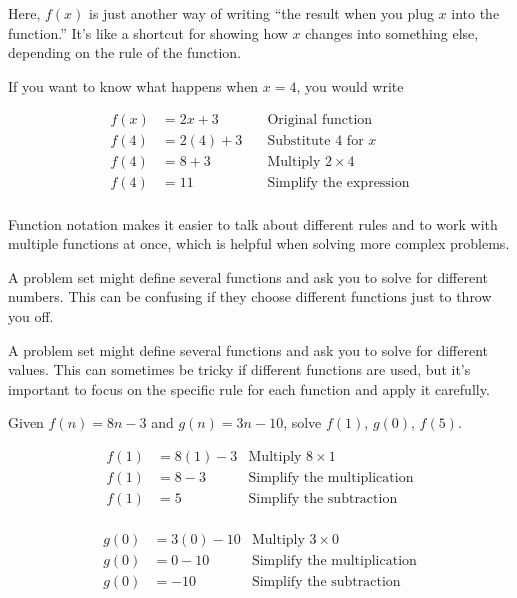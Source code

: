 \documentclass[12pt]{article}
\begin{document}
Here, $f(x)$ is just another way of writing ``the result when you plug $x$ into
the function.'' It’s like a shortcut for showing how $x$ changes into something
else, depending on the rule of the function.

If you want to know what happens when $x = 4$, you would write

\begin{align*}
  f(x) & = 2x + 3 \quad   & \text{Original function}            \\
  f(4) & = 2(4) + 3 \quad & \text{Substitute } 4 \text{ for } x \\
  f(4) & = 8 + 3 \quad    & \text{Multiply } 2 \times 4         \\
  f(4) & = 11 \quad       & \text{Simplify the expression}      \\
\end{align*}

Function notation makes it easier to talk about different rules and to work with
multiple functions at once, which is helpful when solving more complex problems.

A problem set might define several functions and ask you to solve for different
numbers. This can be confusing if they choose different functions just to throw
you off.

A problem set might define several functions and ask you to solve for different
values. This can sometimes be tricky if different functions are used, but it’s
important to focus on the specific rule for each function and apply it
carefully.

Given $f(n) = 8n - 3$ and $g(n) = 3n - 10$, solve $f(1)$, $g(0)$, $f(5)$.

\begin{align*}
  f(1) & = 8(1) - 3 & \text{Multiply } 8 \times 1        \\
  f(1) & = 8 - 3    & \text{Simplify the multiplication} \\
  f(1) & = 5        & \text{Simplify the subtraction}    \\
\end{align*}

\begin{align*}
  g(0) & = 3(0) - 10 & \text{Multiply } 3 \times 0        \\
  g(0) & = 0 - 10    & \text{Simplify the multiplication} \\
  g(0) & = -10       & \text{Simplify the subtraction}    \\
\end{align*}
\end{document}
